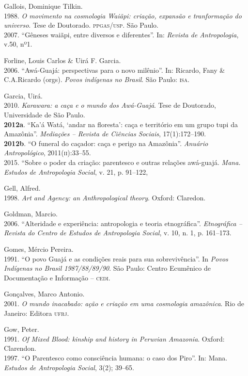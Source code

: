 \begin{bibliohedra}
Gallois, Dominique Tilkin.\\
1988. \emph{O movimento na cosmologia Waiãpi: criação, expansão
e tranformação do universo}. Tese de Doutorado. \textsc{ppgas}/\textsc{usp}. São Paulo.\\
2007. ``Gêneses waiãpi, entre diversos e diferentes''. In:
\emph{Revista de Antropologia}, v.50, nº1.

Forline, Louis Carlos \& Uirá F. Garcia.\\
2006. ``Awá-Guajá: perspectivas para o novo milênio''. In:
Ricardo, Fany \& C.A.Ricardo (orgs). \emph{Povos indígenas no Brasil}.
São Paulo: \textsc{isa}.

Garcia, Uirá.\\
2010. \emph{Karawara: a caça e o mundo dos Awá-Guajá}. Tese de
Doutorado, Universidade de São Paulo.\\
\textbf{2012a}. ``Ka'á Watá, `andar na floresta': caça e território em
um grupo tupi da Amazônia''. \emph{Mediações -- Revista de Ciências
Sociais}, 17(1):172--190.\\
\textbf{2012b}. ``O funeral do caçador: caça e perigo na Amazônia''.
\emph{Anuário Antropológico}, 2011(\textsc{ii}):33--55.\\
2015. ``Sobre o poder da criação: parentesco e outras relações
awá-guajá. \emph{Mana. Estudos de Antropologia Social}, v. 21, p.
91--122,

Gell, Alfred.\\
1998. \emph{Art and Agency: an Anthropological theory}. Oxford:
Claredon.

Goldman, Marcio.\\
2006. ``Alteridade e experiência: antropologia e teoria
etnográfica''. \emph{Etnográfica -- Revista do Centro de Estudos de
Antropologia Social}, v. 10, n. 1, p. 161--173.

Gomes, Mércio Pereira.\\
1991. ``O povo Guajá e as condições reais para sua
sobrevivência''. In \emph{Povos Indígenas no Brasil 1987/88/89/90}. São
Paulo: Centro Ecumênico de Documentação e Informação -- \textsc{cedi}.

Gonçalves, Marco Antonio.\\
2001. \emph{O mundo inacabado: ação e criação em uma cosmologia
amazônica}. Rio de Janeiro: Editora \textsc{ufrj}.

Gow, Peter.\\
1991. \emph{Of Mixed Blood: kinship and history in Peruvian
Amazonia}. Oxford: Clarendon.\\
1997. ``O Parentesco como consciência humana: o caso dos Piro''.
In: Mana. \emph{Estudos de Antropologia Social}, 3(2); 39--65.


\end{bibliohedra}
